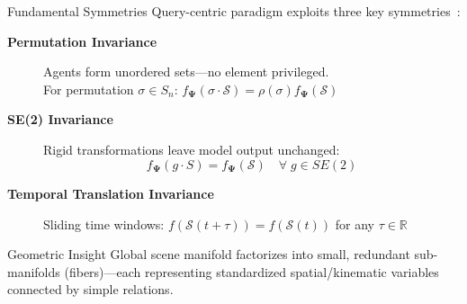 \documentclass[10pt,aspectratio=169]{beamer}
\begin{document}
\begin{frame}{Fundamental Symmetries}
Query-centric paradigm exploits three key symmetries~\cite{qcnetZhou2023}:

\vspace{0.3cm}

\begin{description}
\item[\textbf{Permutation Invariance}]
Agents form unordered sets—no element privileged.\\ For permutation $\sigma \in S_n$: $f_{\boldsymbol{\Psi}}(\sigma \cdot \mathcal{S}) = \rho(\sigma) f_{\boldsymbol{\Psi}}(\mathcal{S})$

\item[\textbf{SE(2) Invariance}]
Rigid transformations leave model output unchanged:
\begin{equation}
f_{\boldsymbol{\Psi}}(g \cdot S) = f_{\boldsymbol{\Psi}}(\mathcal{S}) \quad \forall\; g \in SE(2)
\end{equation}

\item[\textbf{Temporal Translation Invariance}]
Sliding time windows: $f(\mathcal{S}(t+\tau)) = f(\mathcal{S}(t))$ for any $\tau \in \mathbb{R}$
\end{description}

\begin{block}{Geometric Insight}
Global scene manifold factorizes into small, redundant sub-manifolds (fibers)—each representing standardized spatial/kinematic variables connected by simple relations.
\end{block}
\end{frame}
\end{document}
